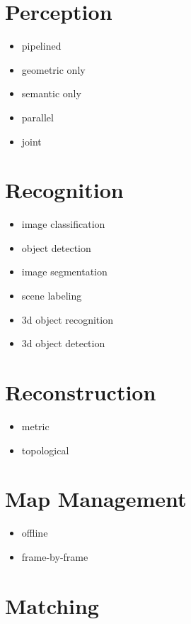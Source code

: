 \documentclass{article}
\begin{document}
	\section{Perception}
	
	\begin{itemize}
		\item pipelined
		\item geometric only
		\item semantic only
		\item parallel
		\item joint
	\end{itemize}
	
	\section{Recognition}
	
	\begin{itemize}
		\item image classification
		\item object detection
		\item image segmentation
		\item scene labeling
		\item 3d object recognition
		\item 3d object detection
	\end{itemize}
	
	\section{Reconstruction}
	
	\begin{itemize}
		\item metric
		\item topological
	\end{itemize}
	
	\section{Map Management}
	
	\begin{itemize}
		\item offline
		\item frame-by-frame
	\end{itemize}
	
	\section{Matching}
	
\end{document}
